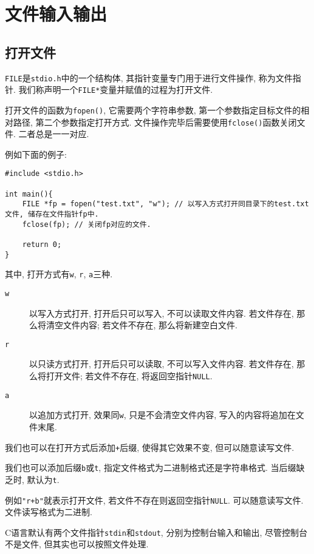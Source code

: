 \chapter{文件输入输出} \label{文件输入输出}
    \section{打开文件}
        \texttt{FILE}是\texttt{stdio.h}中的一个结构体, 其指针变量专门用于进行文件操作, 称为文件指针. 我们称声明一个\texttt{FILE*}变量并赋值的过程为打开文件.

        打开文件的函数为\texttt{fopen()}, 它需要两个字符串参数, 第一个参数指定目标文件的相对路径, 第二个参数指定打开方式. 文件操作完毕后需要使用\texttt{fclose()}函数关闭文件. 二者总是一一对应.

        例如下面的例子:
\begin{lstlisting}
#include <stdio.h>

int main(){
    FILE *fp = fopen("test.txt", "w"); // 以写入方式打开同目录下的test.txt文件, 储存在文件指针fp中.
    fclose(fp); // 关闭fp对应的文件.

    return 0;
}
\end{lstlisting}

        其中, 打开方式有\texttt{w}, \texttt{r}, \texttt{a}三种.
        \begin{description}
            \item[\texttt{w}] 以写入方式打开, 打开后只可以写入, 不可以读取文件内容. 若文件存在, 那么将清空文件内容; 若文件不存在, 那么将新建空白文件.
            \item[\texttt{r}] 以只读方式打开, 打开后只可以读取, 不可以写入文件内容. 若文件存在, 那么将打开文件; 若文件不存在, 将返回空指针\texttt{NULL}.
            \item[\texttt{a}] 以追加方式打开, 效果同\texttt{w}, 只是不会清空文件内容, 写入的内容将追加在文件末尾. 
        \end{description}

        我们也可以在打开方式后添加\texttt{+}后缀, 使得其它效果不变, 但可以随意读写文件.

        我们也可以添加后缀\texttt{b}或\texttt{t}, 指定文件格式为二进制格式还是字符串格式. 当后缀缺乏时, 默认为\texttt{t}.

        例如\texttt{"r+b"}就表示打开文件, 若文件不存在则返回空指针\texttt{NULL}. 可以随意读写文件. 文件读写格式为二进制.

        C语言默认有两个文件指针\texttt{stdin}和\texttt{stdout}, 分别为控制台输入和输出, 尽管控制台不是文件, 但其实也可以按照文件处理.

